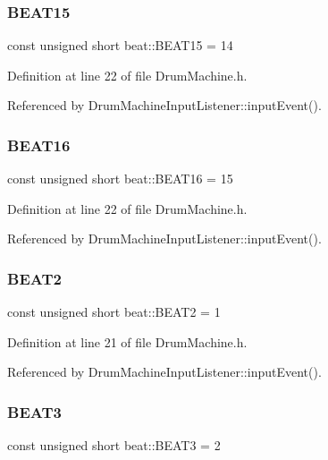 \subsubsection{\texorpdfstring{B\+E\+A\+T15}{BEAT15}}
{\footnotesize\ttfamily const unsigned short beat\+::\+B\+E\+A\+T15 = 14}



Definition at line 22 of file Drum\+Machine.\+h.



Referenced by Drum\+Machine\+Input\+Listener\+::input\+Event().

\mbox{\label{namespacebeat_ad619f02c1a78c30570d7371411f1ef47}} 
\subsubsection{\texorpdfstring{B\+E\+A\+T16}{BEAT16}}
{\footnotesize\ttfamily const unsigned short beat\+::\+B\+E\+A\+T16 = 15}



Definition at line 22 of file Drum\+Machine.\+h.



Referenced by Drum\+Machine\+Input\+Listener\+::input\+Event().

\mbox{\label{namespacebeat_a219eb8f5f0218df3af3f4d4d9214327f}} 
\subsubsection{\texorpdfstring{B\+E\+A\+T2}{BEAT2}}
{\footnotesize\ttfamily const unsigned short beat\+::\+B\+E\+A\+T2 = 1}



Definition at line 21 of file Drum\+Machine.\+h.



Referenced by Drum\+Machine\+Input\+Listener\+::input\+Event().

\mbox{\label{namespacebeat_a0ccf0d5bdc6dfdae1fd7b1667655a18f}} 
\subsubsection{\texorpdfstring{B\+E\+A\+T3}{BEAT3}}
{\footnotesize\ttfamily const unsigned short beat\+::\+B\+E\+A\+T3 = 2}



